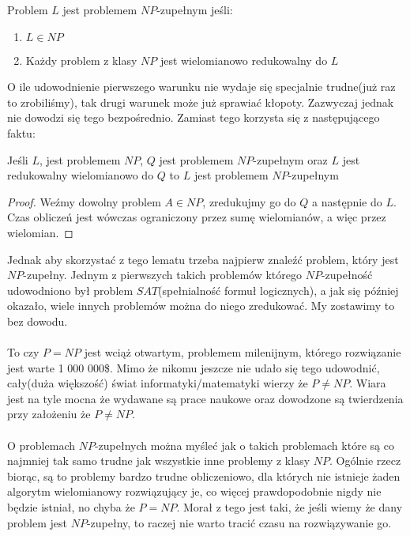 \begin{definition}
Problem $L$ jest problemem $NP$-zupełnym jeśli:
\begin{enumerate}
\item $L \in NP$
\item Każdy problem z klasy $NP$ jest wielomianowo redukowalny do $L$
\end{enumerate}
\end{definition}
\noindent
O ile udowodnienie pierwszego warunku nie wydaje się specjalnie trudne(już raz to zrobiliśmy), tak drugi warunek może już sprawiać kłopoty. 
Zazwyczaj jednak nie dowodzi się tego bezpośrednio. 
Zamiast tego korzysta się z następującego faktu:
\begin{lemma}
Jeśli $L$, jest problemem $NP$, $Q$ jest problemem $NP$-zupełnym oraz $L$ jest redukowalny wielomianowo do $Q$ to $L$ jest problemem $NP$-zupełnym
\end{lemma}
\begin{proof}
Weźmy dowolny problem $A \in NP$, zredukujmy go do $Q$ a następnie do $L$. Czas obliczeń jest wówczas ograniczony przez sumę wielomianów, a więc przez wielomian.
\end{proof}
\noindent
Jednak aby skorzystać z tego lematu trzeba najpierw znaleźć problem, który jest $NP$-zupełny. 
Jednym z pierwszych takich problemów którego $NP$-zupełność udowodniono był problem $SAT$(spełnialność formuł logicznych), a jak się później okazało, 
wiele innych problemów można do niego zredukować. 
My zostawimy to bez dowodu. 
\\ 
\\ \noindent
To czy $P = NP$ jest wciąż otwartym, problemem milenijnym, którego rozwiązanie jest warte 1 000 000\$. 
Mimo że nikomu jeszcze nie udało się tego udowodnić, cały(duża większość) świat informatyki/matematyki wierzy że $P \neq NP$. 
Wiara jest na tyle mocna że wydawane są prace naukowe oraz dowodzone są twierdzenia przy założeniu że $P \neq NP$.
\\ 
\\ \noindent
O problemach $NP$-zupełnych można myśleć jak o takich problemach które są co najmniej tak samo trudne jak wszystkie inne problemy z klasy $NP$. 
Ogólnie rzecz biorąc, są to problemy bardzo trudne obliczeniowo, dla których nie istnieje żaden algorytm wielomianowy rozwiązujący je, co więcej prawdopodobnie nigdy nie będzie istniał, no chyba że $P = NP$.
Morał z tego jest taki, że jeśli wiemy że dany problem jest $NP$-zupełny, to raczej nie warto tracić czasu na rozwiązywanie go.
\\ 
